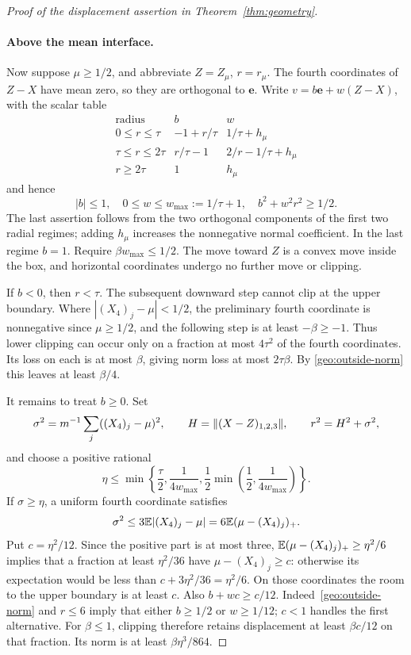 \begin{proof}[Proof of the displacement assertion in Theorem~\ref{thm:geometry}]
\paragraph{Above the mean interface.}
Now suppose $\mu\ge1/2$, and abbreviate $Z=Z_\mu$, $r=r_\mu$.
The fourth coordinates of $Z-X$ have mean zero, so they are orthogonal
to $\mathbf e$. Write $v=b\mathbf e+w(Z-X)$, with the scalar table
\begin{equation}\label{geo:outside-coefficients}
\begin{array}{c|cc}
\text{radius}&b&w\\\hline
0\le r\le\tau&-1+r/\tau&1/\tau+h_\mu\\
\tau\le r\le2\tau&r/\tau-1&2/r-1/\tau+h_\mu\\
r\ge2\tau&1&h_\mu
\end{array}
\end{equation}
and hence
\begin{equation}\label{geo:outside-norm}
 |b|\le1,\quad0\le w\le w_{\max}:=1/\tau+1,
 \quad b^2+w^2r^2\ge1/2.
\end{equation}
The last assertion follows from the two orthogonal components of the
first two radial regimes; adding $h_\mu$ increases the nonnegative
normal coefficient. In the last regime $b=1$. Require
$\beta w_{\max}\le1/2$. The move toward $Z$ is a convex move inside
the box, and horizontal coordinates undergo no further move or clipping.

If $b<0$, then $r<\tau$. The subsequent downward step cannot clip at
the upper boundary. Where $|(X_4)_j-\mu|<1/2$, the preliminary fourth
coordinate is nonnegative since $\mu\ge1/2$, and the following step
is at least $-\beta\ge-1$. Thus lower clipping can occur only on a
fraction at most $4\tau^2$ of the fourth coordinates. Its loss on each
is at most $\beta$, giving norm loss at most $2\tau\beta$. By
\eqref{geo:outside-norm} this leaves at least $\beta/4$.

It remains to treat $b\ge0$. Set
\[
 \sigma^2=m^{-1}\sum_j((X_4)_j-\mu)^2,\qquad
 H=\lVert (X-Z)_{1,2,3}\rVert,\qquad r^2=H^2+\sigma^2,
\]
and choose a positive rational
\begin{equation}\label{geo:eta-choice}
 \eta\le\min\left\{\frac\tau2,\frac1{4w_{\max}},
           \frac12\min\left(\frac12,\frac1{4w_{\max}}\right)\right\}.
\end{equation}
If $\sigma\ge\eta$, a uniform fourth coordinate satisfies
\[
 \sigma^2\le3\mathbb{E}|(X_4)_j-\mu|
        =6\mathbb{E}(\mu-(X_4)_j)_+.
\]
Put $c=\eta^2/12$. Since the positive part is at most three,
$\mathbb{E}(\mu-(X_4)_j)_+\ge\eta^2/6$ implies that a fraction at least
$\eta^2/36$ have $\mu-(X_4)_j\ge c$: otherwise its expectation
would be less than $c+3\eta^2/36=\eta^2/6$.
On those coordinates the room to the upper boundary is at least $c$.
Also $b+wc\ge c/12$. Indeed~\eqref{geo:outside-norm} and $r\le6$
imply that either $b\ge1/2$ or $w\ge1/12$; $c<1$ handles the first
alternative. For $\beta\le1$, clipping therefore retains displacement
at least $\beta c/12$ on that fraction. Its norm is at least
$\beta\eta^3/864$.


\end{proof}
